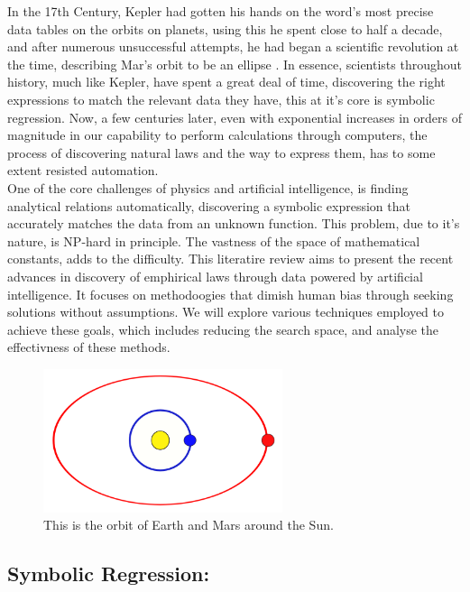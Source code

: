 \documentclass{article}
\begin{document}
In the 17th Century, Kepler had gotten his hands on the word’s most precise data tables on the orbits
on planets, using this he spent close to half a decade, and after numerous unsuccessful
attempts, he had began a scientific revolution at the time, describing Mar’s orbit to be an ellipse \cite{kepler}.
In essence, scientists throughout history, much like Kepler, have spent a great deal of time, discovering
the right expressions to match the relevant data they have, this at it’s core is symbolic regression. Now,
a few centuries later, even with exponential increases in orders of magnitude in our capability to perform
calculations through computers, the process of discovering natural laws and the way to express them,
has to some extent resisted automation.\\


One of the core challenges of physics and artificial intelligence, is finding analytical relations automatically, discovering a symbolic expression that accurately matches the data from an unknown function.
This problem, due to it’s nature, is NP-hard \cite{Hope2023} in principle. The vastness of the space
of mathematical constants, adds to the difficulty. 
This literatire review aims to present the recent advances in discovery of emphirical laws through data powered by artificial intelligence. It focuses on methodoogies that dimish human bias through seeking solutions without assumptions. We will explore various techniques employed to achieve these goals, which includes reducing the search space, and analyse the effectivness of these methods.\\  

\begin{figure}[h] 
    \centering
    \includegraphics[width=7cm]{Sun_Mars_Orbit} 
    \caption{This is the orbit of Earth and Mars around the Sun.}
    \label{fig:Orbit} 
\end{figure}


\subsection{Symbolic Regression: }
\end{document}
